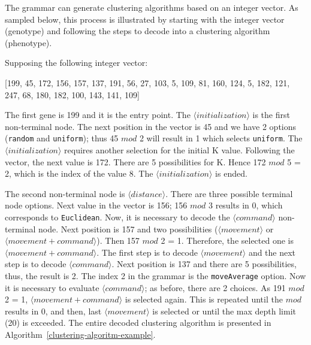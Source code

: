 \documentclass[conference]{IEEEtran}
\begin{document}
	
	The grammar can generate clustering algorithms based on an integer vector. As sampled below, this process is illustrated by starting with the integer vector (genotype) and following the steps to decode into a clustering algorithm (phenotype). 
	
	Supposing the following integer vector:
	
	\vspace{0.2cm}
	
	[199, 45, 172, 156, 157, 137, 191, 56, 27, 103, 5, 109, 81, 160, 124, 5, 182, 121, 247, 68, 180, 182, 100, 143, 141, 109]
	
	\vspace{0.2cm}
	
	The first gene is 199 and it is the entry point. The $\langle initialization \rangle$ is the first non-terminal node. The next position in the vector is 45 and we have 2 options (\texttt{random} and \texttt{uniform}); thus 45 $mod$ 2 will result in 1 which selects \texttt{uniform}. The $\langle initialization \rangle$ requires another selection for the initial K value. Following the vector, the next value is 172. There are 5 possibilities for K. Hence 172 $mod$ 5 = 2, which is the index of the value 8. The $\langle initialization \rangle$ is ended.
	
	The second non-terminal node is $\langle distance \rangle$. There are three possible terminal node options. Next value in the vector is 156; 156 $mod$ 3 results in 0, which corresponds to \texttt{Euclidean}. Now, it is necessary to decode the $\langle command \rangle$ non-terminal node. Next position is 157 and two possibilities ($\langle movement \rangle$ or $\langle movement + command \rangle$). Then 157 $mod$ 2 = 1. Therefore, the selected one is $\langle movement + command \rangle$. The first step is to decode $\langle movement\rangle$ and the next step is to decode  $\langle command \rangle$. Next position is 137 and there are 5 possibilities, thus, the result is 2. The index 2 in the grammar is the \texttt{moveAverage} option. Now it is necessary to evaluate $\langle command \rangle$; as before, there are 2 choices. As 191 $mod$ 2 = 1, $\langle movement + command \rangle$ is selected again. This is repeated until the $mod$ results in 0,  and then, last $\langle movement \rangle$ is selected or until the max depth limit (20) is exceeded. The entire decoded clustering algorithm is presented in Algorithm~\ref{clustering-algoritm-example}.
	
\end{document}

